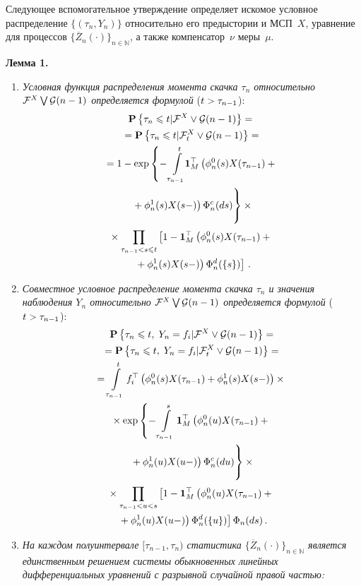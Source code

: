 \begin{multicols}{2}
 Следующее вспомогательное утверждение определяет искомое условное
 распределение $\{(\tau_n,Y_n)\}$ относительно его предыстории и МСП~$X$,
 уравнение для процессов $\{\overline{Z}_n(\cdot)\}_{n \in \mathbb{N}}$, а
 также компенсатор~$\nu$ меры~$\mu$.

\medskip

\noindent
\textbf{Лемма 1.}
 \begin{enumerate}
 \item
\textit{ Условная функция распределения момента скачка $\tau_n$ относительно
${\mathcal F}^X  \bigvee {\mathcal G} (n-1)$ определяется формулой} ($t \hm> \tau_{n-1}$):
 \begin{multline}
 \pp{\tau_n \leqslant t | \ff^X  \vee \G (n-1)} ={}\\
 {}=
 \pp{\tau_n \leqslant t | \ff_{t}^X  \vee \G (n-1)} ={} \\
{} = 1-\exp \left\{
 -\int\limits_{\tau_{n-1}}^t \hspace*{-1mm}\mathbf{1}_M^{\top}\left(
 \phi^0_n(s)X(\tau_{n-1})+{}\right.\right.\\
\left.\left. {}+\phi^1_n(s)X(s-)
 \right)\Phi^c_n(ds)
 \vphantom{\int\limits_{\tau_{n-1}}^t}
 \right\} \times {}\\
{} \times \prod\limits_{\tau_{n-1} < s \leqslant t}\left[
 1-
 \mathbf{1}_M^{\top}\left(
 \phi^0_n(s)X(\tau_{n-1})+{}\right.\right.\\
\left.\left. {}+\phi^1_n(s)X(s-)
 \right)\Phi^d_n(\{s\})
 \right]\,.
 \label{eq:tau_dist}
 \end{multline}
 \item \textit{Совместное условное распределение момента
 скачка $\tau_n$ и значения наблюдения $Y_n$
 относительно ${\mathcal F}^X  \bigvee {\mathcal G} (n-1)$ определяется формулой}
 ($t\hm>\tau_{n-1}$):
 \begin{multline*}
 \pp{\tau_n \leqslant t, \; Y_n = f_i | \ff^X  \vee \G (n-1)} = \\ =\pp{\tau_n \leqslant t, \; Y_n = f_i | \ff_{t}^X  \vee \G (n-1)} = \\
 =
 \int\limits_{\tau_{n-1}}^{t}f_i^{\top}\left(\phi^0_{n}(s)X(\tau_{n-1})+\phi^1_{n}(s)X(s-)
 \right) \times {}\\
 {}\times
 \exp \left\{
 -\int\limits_{\tau_{n-1}}^s \mathbf{1}_M^{\top}\left(
 \phi^0_n(u)X(\tau_{n-1})+{}\right.\right.\\
\left.\left. {}+\phi^1_n(u)X(u-)
 \right)\Phi^c_n(du)
 \vphantom{\int\limits_{\tau_{n-1}}^s}
 \right\} \times {}\\
{} \times \prod\limits_{\tau_{n-1} < u < s}\left[
 1-
 \mathbf{1}_M^{\top}\left(
 \phi^0_n(u)X(\tau_{n-1})+{}\right.\right.\\
\left.\left. {}+\phi^1_n(u)X(u-)
 \right)\Phi^d_n(\{u\})
 \right]
 \Phi_{n}(ds)\,.
 \end{multline*}
 \item
\textit{ На каждом полуинтервале $[\tau_{n-1},\tau_{n})$
статистика $\{\overline{Z}_n(\cdot)\}_{n \in \mathbb{N}}$ является единственным
решением системы обыкновенных линейных дифференциальных уравнений с разрывной
случайной правой \mbox{частью}:}


\end{enumerate}
\end{multicols}
